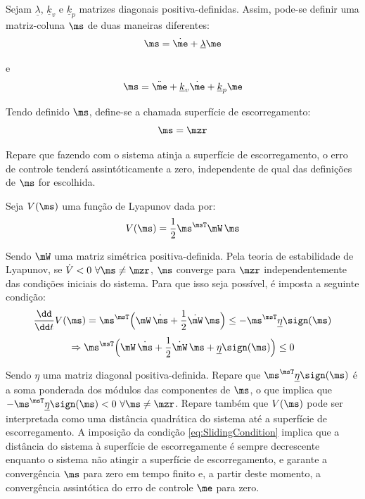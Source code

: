 \documentclass[]{politex}
\begin{document}
Sejam $\underline{\lambda}$, $\underline{k}_v$ e $\underline{k}_p$ matrizes diagonais positiva-definidas. Assim, pode-se definir uma matriz-coluna $\ms$ de duas maneiras diferentes:
\begin{equation} \label{eq:SlidingSurfaces}
\ms = \dot{\me} + \underline{\lambda}\me
\end{equation}

e
\begin{equation} \label{eq:SlidingSurfaces_}
\ms = \ddot{\me} + \underline{k}_v\dot{\me} + \underline{k}_p\me
\end{equation}

Tendo definido $\ms$, define-se a chamada superfície de escorregamento:
\begin{equation} \label{eq:SuperficieDeEscorregamento}
\ms = \mzr
\end{equation}

Repare que fazendo com o sistema atinja a superfície de escorregamento, o erro de controle tenderá assintóticamente a zero, independente de qual das definições de $\ms$ for escolhida.
 
Seja $V(\ms)$ uma função de Lyapunov dada por:
\begin{equation}
V(\ms) = \frac{1}{2} \ms^\msT \mW \, \ms
\end{equation}

Sendo $\mW$ uma matriz simétrica positiva-definida. Pela teoria de estabilidade de Lyapunov, se $\dot{V} < 0 \,\, \forall \ms \neq \mzr$, $\ms$ converge para $\mzr$ independentemente das condi\c{c}\~oes iniciais do sistema. Para que isso seja poss\'ivel, \'e imposta a seguinte condi\c{c}\~ao:
\begin{equation} \label{eq:SlidingCondition}
\frac{\dd}{\dd t} V(\ms) = \ms^\msT \Big( \mW \, \dot{\ms} + \frac{1}{2}  \dot{\mW} \, \ms \Big) \leq -   \ms^\msT \underline{\eta} \sign(\ms) 
\end{equation}
\begin{equation}
\Rightarrow \ms^\msT \Big( \mW \, \dot{\ms} + \frac{1}{2}  \dot{\mW} \, \ms + \underline{\eta} \sign(\ms)  \Big) \leq 0
\end{equation}

Sendo $\underline{\eta}$ uma matriz diagonal positiva-definida. Repare que $\ms^\msT \underline{\eta} \sign(\ms)$ \'e a soma ponderada dos m\'odulos das componentes de $\ms$, o que implica que $-  \ms^\msT \underline{\eta} \sign(\ms) < 0 \,\, \forall \ms \neq \mzr$. Repare tamb\'em que $V(\ms)$ pode ser interpretada como uma distância quadrática do sistema até a superfície de escorregamento. A imposição da condição \eqref{eq:SlidingCondition} implica que a distância do sistema à superfície de escorregamente é sempre decrescente enquanto o sistema não atingir a superfície de escorregamento, e garante a convergência $\ms$ para zero em tempo finito e, a partir deste momento, a convergência assintótica do erro de controle $\me$ para zero. 
\end{document}
